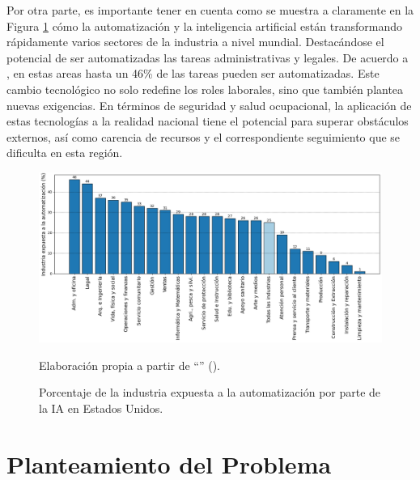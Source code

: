 Por otra parte, es importante tener en cuenta como se muestra a claramente en la Figura \ref{fig:share_of_industry_exposed_to_automation_ai_gs} cómo la automatización y la inteligencia artificial están transformando rápidamente varios sectores de la industria a nivel mundial. Destacándose el potencial de ser automatizadas las tareas administrativas y legales. De acuerdo a \textcite{hatzius2023potentially}, en estas areas hasta un 46\% de las tareas pueden ser automatizadas. Este cambio tecnológico no solo redefine los roles laborales, sino que también plantea nuevas exigencias. En términos de seguridad y salud ocupacional, la aplicación de estas tecnologías a la realidad nacional tiene el potencial para superar obstáculos externos, así como carencia de recursos y el correspondiente seguimiento que se dificulta en esta región. 

\begin{figure}[htb]
	\centering
	\includegraphics[width=\textwidth]{images/marcoref/share_of_industry_exposed_to_automation_ai.png}
	\caption{Porcentaje de la industria expuesta a la automatización por parte de la IA en Estados Unidos.} \vspace{-0.2cm}
	\footnotesize{{Elaboración propia a partir de ``\textit{}'' (\citeyear{hatzius2023potentially}).}}
	\label{fig:share_of_industry_exposed_to_automation_ai_gs} 
\end{figure}

\section{Planteamiento del Problema}

